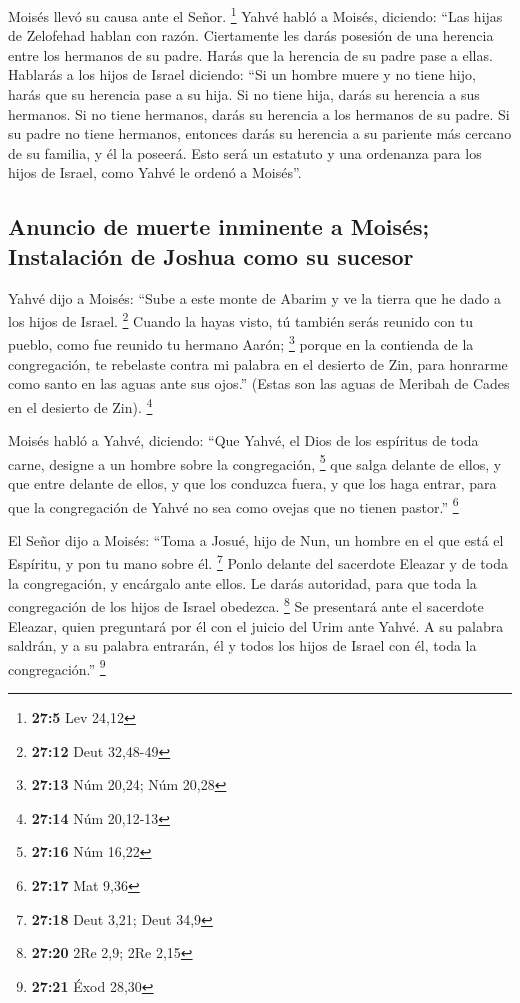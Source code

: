 \begin{paracol}{2}
 Moisés llevó su causa ante el Señor. \footnote{\textbf{27:5}
  Lev 24,12}  Yahvé habló a Moisés, diciendo:
 ``Las hijas de Zelofehad hablan con razón. Ciertamente
les darás posesión de una herencia entre los hermanos de su padre. Harás
que la herencia de su padre pase a ellas.  Hablarás a los
hijos de Israel diciendo: ``Si un hombre muere y no tiene hijo, harás
que su herencia pase a su hija.  Si no tiene hija, darás
su herencia a sus hermanos.  Si no tiene hermanos, darás
su herencia a los hermanos de su padre.  Si su padre no
tiene hermanos, entonces darás su herencia a su pariente más cercano de
su familia, y él la poseerá. Esto será un estatuto y una ordenanza para
los hijos de Israel, como Yahvé le ordenó a Moisés''.

\hypertarget{anuncio-de-muerte-inminente-a-moisuxe9s-instalaciuxf3n-de-joshua-como-su-sucesor}{%
\subsection{Anuncio de muerte inminente a Moisés; Instalación de Joshua
como su
sucesor}\label{anuncio-de-muerte-inminente-a-moisuxe9s-instalaciuxf3n-de-joshua-como-su-sucesor}}

 Yahvé dijo a Moisés: ``Sube a este monte de Abarim y ve
la tierra que he dado a los hijos de Israel. \footnote{\textbf{27:12}
  Deut 32,48-49}  Cuando la hayas visto, tú también serás
reunido con tu pueblo, como fue reunido tu hermano Aarón; \footnote{\textbf{27:13}
  Núm 20,24; Núm 20,28}  porque en la contienda de la
congregación, te rebelaste contra mi palabra en el desierto de Zin, para
honrarme como santo en las aguas ante sus ojos.'' (Estas son las aguas
de Meribah de Cades en el desierto de Zin). \footnote{\textbf{27:14} Núm
  20,12-13}

 Moisés habló a Yahvé, diciendo:  ``Que
Yahvé, el Dios de los espíritus de toda carne, designe a un hombre sobre
la congregación, \footnote{\textbf{27:16} Núm 16,22}  que
salga delante de ellos, y que entre delante de ellos, y que los conduzca
fuera, y que los haga entrar, para que la congregación de Yahvé no sea
como ovejas que no tienen pastor.'' \footnote{\textbf{27:17} Mat 9,36}

 El Señor dijo a Moisés: ``Toma a Josué, hijo de Nun, un
hombre en el que está el Espíritu, y pon tu mano sobre él. \footnote{\textbf{27:18}
  Deut 3,21; Deut 34,9}  Ponlo delante del sacerdote
Eleazar y de toda la congregación, y encárgalo ante ellos.
 Le darás autoridad, para que toda la congregación de los
hijos de Israel obedezca. \footnote{\textbf{27:20} 2Re 2,9; 2Re 2,15}
 Se presentará ante el sacerdote Eleazar, quien
preguntará por él con el juicio del Urim ante Yahvé. A su palabra
saldrán, y a su palabra entrarán, él y todos los hijos de Israel con él,
toda la congregación.'' \footnote{\textbf{27:21} Éxod 28,30}


\end{paracol}
